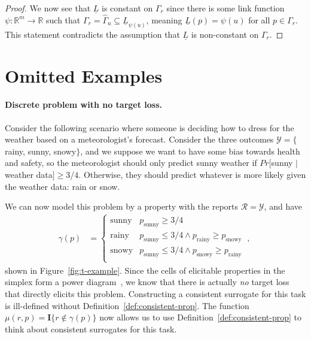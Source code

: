 \documentclass[anon,12pt]{colt2021} %
\newcommand{\reals}{\mathbb{R}}
\newcommand{\propdis}{\mu}
\newcommand{\R}{\mathcal{R}}
\newcommand{\Y}{\mathcal{Y}}
\newcommand{\lbar}{\underline{L}} %
\newcommand{\Ind}[1]{\mathbf{I}\{{#1}\}}
\begin{document}
\begin{proof}
  We now see that $\lbar$ is constant on $\Gamma_r$ since there is some link function $\psi:\reals^m\to\reals$ such that $\Gamma_r = \hat\Gamma_u \subseteq \lbar_{\psi(u)}$, meaning $\lbar(p) = \psi(u)$ for all $p\in\Gamma_r$.
  This statement contradicts the assumption that $\lbar$ is non-constant on $\Gamma_r$.
\end{proof}



\section{Omitted Examples}\label{app:omitted-examples}
\paragraph{Discrete problem with no target loss.}
Consider the following scenario where someone is deciding how to dress for the weather based on a meteorologist's forecast.
Consider the three outcomes $\Y = \{$rainy, sunny, snowy$\}$, and we suppose we want to have some bias towards health and safety, so the meteorologist should only predict sunny weather if $Pr[$sunny $|$ weather data$] \geq 3/4$.
Otherwise, they should predict whatever is more likely  given the weather data: rain or snow.

We can now model this problem by a property with the reports $\R = \Y$, and have 
\begin{align*}
\gamma(p) &= \begin{cases}
\text{sunny} & p_{\text{sunny}} \geq 3/4 \\
\text{rainy} & p_{\text{sunny}} \leq 3/4 \wedge p_{\text{rainy}} \geq p_{\text{snowy}} \\
\text{snowy} & p_{\text{sunny}} \leq 3/4 \wedge p_{\text{snowy}} \geq p_{\text{rainy}} \\
\end{cases}~,~
\end{align*} 
shown in Figure~\ref{fig:t-example}.
Since the cells of elicitable properties in the simplex form a power diagram~\citep{lambert2009eliciting}, we know that there is actually \emph{no} target loss that directly elicits this problem.
Constructing a consistent surrogate for this task is ill-defined without Definition~\ref{def:consistent-prop}.
The function $\propdis(r,p) = \Ind{r \not \in \gamma(p)}$ 
now allows us to use Definition~\ref{def:consistent-prop} to think about consistent surrogates for this task.
\end{document}
